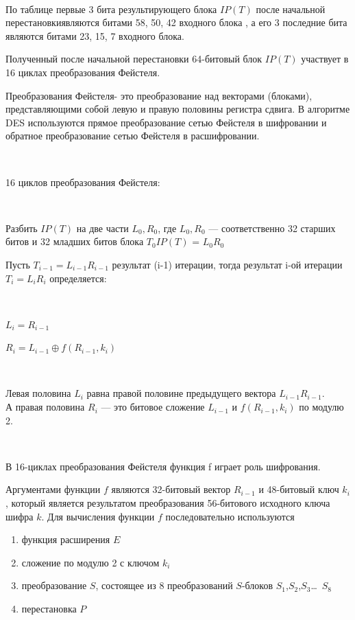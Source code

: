 \documentclass[a4paper]{report}
\begin{document}
~

По таблице первые 3 бита результирующего блока $IP(T)$ после начальной перестановкиявляются битами 58, 50, 42 входного блока , а его 3 последние бита являются битами 23, 15, 7 входного блока.

Полученный после начальной перестановки 64-битовый блок $IP(T)$ участвует в 16 циклах преобразования Фейстеля.

Преобразования Фейстеля- это преобразование над векторами (блоками), представляющими собой левую и правую половины регистра сдвига. В алгоритме DES используются прямое преобразование сетью Фейстеля в шифровании и обратное преобразование сетью Фейстеля в расшифровании.

~

16 циклов преобразования Фейстеля:

~

Разбить $IP(T)$ на две части $L_0, R_0$, где $L_0, R_0$ — соответственно 32 старших битов и 32 младших битов блока $T_{0} IP(T)$ = $L_0 R_0$

Пусть $T_{i-1}=L_{i-1}R_{i-1}$ результат (i-1) итерации, тогда результат i-ой итерации $T_{i}=L_{i}R_{i}$ определяется:

~

$L_i = R_{i-1}$ 

$R_{i}=L_{i-1}\oplus f(R_{i-1},k_{i})$ 

~

Левая половина $L_{i}$ равна правой половине предыдущего вектора $L_{i-1}R_{i-1}$.\\ А правая половина $R_i$ — это битовое сложение $L_{i-1}$ и $f(R_{i-1},k_{i})$ по модулю 2.

~

В 16-циклах преобразования Фейстеля функция f играет роль шифрования.

Аргументами функции $f$ являются 32-битовый вектор $R_{i-1}$ и 48-битовый ключ $k_{i}$, который является результатом преобразования 56-битового исходного ключа шифра $k$. Для вычисления функции $f$ последовательно используются

\begin{enumerate}
\item функция расширения $E$
\item сложение по модулю 2 с ключом $k_{i}$
\item преобразование $S$, состоящее из 8 преобразований $S$-блоков ${S} _{1}$,${S} _{2}$,${S} _{3}$\ldots \ ${S} _{8}$
\item перестановка $P$
\end{enumerate}
\end{document}
